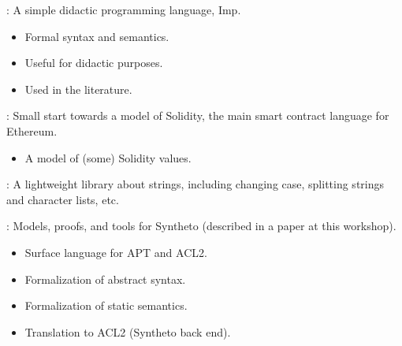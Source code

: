 
\begin{frame}

\newlibtitle

:
A simple didactic programming language, Imp.
\begin{itemize}
\item Formal syntax and semantics.
\item Useful for didactic purposes.
\item Used in the literature.
\end{itemize}

\end{frame}


\begin{frame}

\newlibtitle

:
Small start towards a model of Solidity,
the main smart contract language for Ethereum.
\begin{itemize}
\item A model of (some) Solidity values.
\end{itemize}

\end{frame}


\begin{frame}

\newlibtitle

:
A lightweight library about strings, including changing case,
splitting strings and character lists, etc.

\end{frame}


\begin{frame}

\newlibtitle

:
Models, proofs, and tools for Syntheto (described in a paper at this workshop).
\begin{itemize}
\item Surface language for APT and ACL2.
\item Formalization of abstract syntax.
\item Formalization of static semantics.
\item Translation to ACL2 (Syntheto back end).
\end{itemize}

\end{frame}

